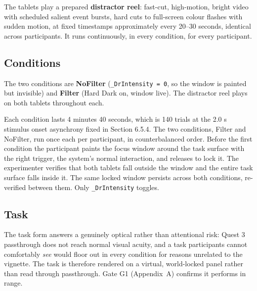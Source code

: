 
The tablets play a prepared \textbf{distractor reel}: fast-cut, high-motion, bright video with scheduled
salient event bursts, hard cuts to full-screen colour flashes with sudden motion, at fixed
timestamps approximately every 20–30 seconds, identical across participants. It runs continuously, in
every condition, for every participant.

\subsection{Conditions}

The two conditions are \textbf{NoFilter} (\verb|_DrIntensity = 0|, so the window is painted but
invisible) and \textbf{Filter} (Hard Dark on, window live). The distractor reel plays on both tablets
throughout each.

Each condition lasts 4 minutes 40 seconds, which is 140 trials at the 2.0 s stimulus onset
asynchrony fixed in Section 6.5.4. The two conditions, Filter and NoFilter, run once each per
participant, in counterbalanced order. Before the first condition the participant paints the focus
window around the task surface with the right trigger, the system's normal interaction, and releases
to lock it. The experimenter verifies that both tablets fall outside the window and the entire task
surface falls inside it. The same locked window persists across both conditions, re-verified between
them. Only \verb|_DrIntensity| toggles.

\subsection{Task}

The task form answers a genuinely optical rather than attentional risk: Quest 3 passthrough does not
reach normal visual acuity, and a task participants cannot comfortably \textit{see} would floor out in
every condition for reasons unrelated to the vignette. The task is therefore rendered on a virtual,
world-locked panel rather than read through passthrough. Gate G1 (Appendix~A) confirms it performs
in range.

